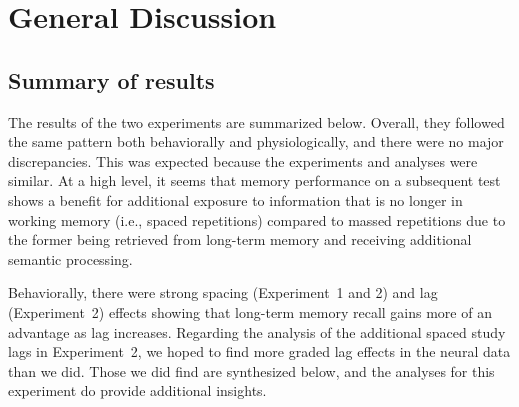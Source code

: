 
\chapter{General Discussion}





\section{Summary of results}


The results of the two experiments are summarized below.  Overall, they followed the same pattern both behaviorally and physiologically, and there were no major discrepancies.  This was expected because the experiments and analyses were similar.  At a high level, it seems that memory performance on a subsequent test shows a benefit for additional exposure to information that is no longer in working memory (i.e., spaced repetitions) compared to massed repetitions due to the former being retrieved from long-term memory and receiving additional semantic processing.

Behaviorally, there were strong spacing (Experiment~1 and 2) and lag (Experiment~2) effects showing that long-term memory recall gains more of an advantage as lag increases.
Regarding the analysis of the additional spaced study lags in Experiment~2, we hoped to find more graded lag effects in the neural data than we did.  Those we did find are synthesized below, and the analyses for this experiment do provide additional insights.

